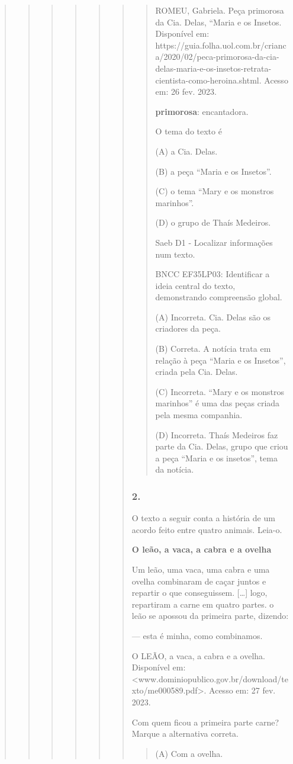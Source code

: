 \begin{quote}
\begin{quote}
\begin{quote}
\begin{quote}
\begin{quote}
\begin{quote}
\begin{quote}
ROMEU, Gabriela. Peça primorosa da Cia. Delas, ``Maria e os Insetos.
Disponível em:
https://guia.folha.uol.com.br/crianca/2020/02/peca-primorosa-da-cia-delas-maria-e-os-insetos-retrata-cientista-como-heroina.shtml.
Acesso em: 26 fev. 2023.

\textbf{primorosa}: encantadora.

O tema do texto é

(A) a Cia. Delas.

(B) a peça ``Maria e os Insetos''.

(C) o tema ``Mary e os monstros marinhos''.

(D) o grupo de Thaís Medeiros.

Saeb D1 - Localizar informações num texto.

BNCC EF35LP03: Identificar a ideia central do texto, demonstrando
compreensão global.

(A) Incorreta. Cia. Delas são os criadores da peça.

(B) Correta. A notícia trata em relação à peça ``Maria e os Insetos'',
criada pela Cia. Delas.

(C) Incorreta. ``Mary e os monstros marinhos'' é uma das peças criada
pela mesma companhia.

(D) Incorreta. Thaís Medeiros faz parte da Cia. Delas, grupo que criou a
peça ``Maria e os insetos'', tema da notícia.
\end{quote}

\subsubsection{2. }\label{section-81}

O texto a seguir conta a história de um acordo feito entre quatro
animais. Leia-o.

\textbf{O leão, a vaca, a cabra e a ovelha}

Um leão, uma vaca, uma cabra e uma ovelha combinaram de caçar juntos e
repartir o que conseguissem. {[}\ldots{}{]} logo, repartiram a carne em
quatro partes. o leão se apossou da primeira parte, dizendo:

--- esta é minha, como combinamos.

O LEÃO, a vaca, a cabra e a ovelha. Disponível em:
\textless{}www.dominiopublico.gov.br/download/texto/me000589.pdf\textgreater{}.
Acesso em: 27 fev. 2023.

Com quem ficou a primeira parte carne? Marque a alternativa correta.

\begin{quote}
(A) Com a ovelha.


\end{quote}
\end{quote}
\end{quote}
\end{quote}
\end{quote}
\end{quote}
\end{quote}
